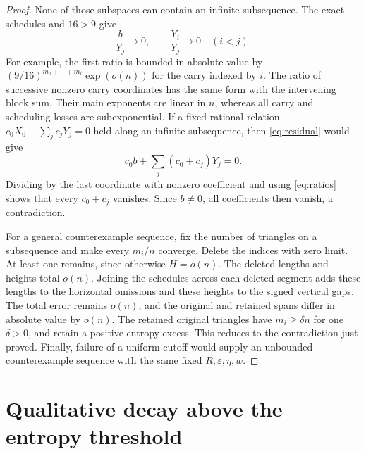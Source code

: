 \documentclass[11pt,a4paper]{article}
\newcommand{\eps}{\varepsilon}
\begin{document}
\begin{proof}
None of those subspaces can contain an infinite subsequence.
The exact schedules and \(16>9\) give
\begin{equation}\label{eq:ratios}
 \frac{b}{Y_j}\longrightarrow0,
 \qquad \frac{Y_i}{Y_j}\longrightarrow0\quad(i<j).
\end{equation}
For example, the first ratio is bounded in absolute value by
\((9/16)^{m_0+\cdots+m_i}\exp(o(n))\) for the carry indexed by \(i\).
The ratio of successive nonzero carry coordinates has the same form
with the intervening block sum. Their main exponents are linear in
\(n\), whereas all carry and scheduling losses are subexponential.
If a fixed rational relation
\(c_0X_0+\sum_jc_jY_j=0\) held along an infinite subsequence, then
\eqref{eq:residual} would give
\[
 c_0b+\sum_j(c_0+c_j)Y_j=0.
\]
Dividing by the last coordinate with nonzero coefficient and using
\eqref{eq:ratios} shows that every \(c_0+c_j\) vanishes. Since
\(b\ne0\), all coefficients then vanish, a contradiction.

For a general counterexample sequence, fix the number of triangles
on a subsequence and make every \(m_i/n\) converge. Delete the indices
with zero limit. At least one remains, since otherwise \(H=o(n)\).
The deleted lengths and heights total \(o(n)\). Joining the schedules
across each deleted segment adds these lengths to the horizontal
omissions and these heights to the signed vertical gaps. The total
error remains \(o(n)\), and the original and retained spans differ
in absolute value by \(o(n)\). The retained original
triangles have \(m_i\ge\delta n\) for one \(\delta>0\), and retain a
positive entropy excess. This reduces to the contradiction just proved.
Finally, failure of a uniform cutoff would supply an unbounded
counterexample sequence with the same fixed \(R,\eps,\eta,w\).
\end{proof}

\section{Qualitative decay above the entropy threshold}\label{sec:qualitative}
\end{document}
